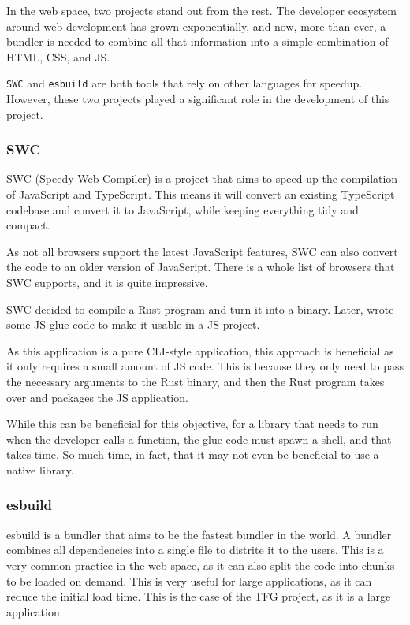 \documentclass[10pt,journal,compsoc]{IEEEtran}
\begin{document}
In the web space, two projects stand out from the rest. The developer ecosystem around web development has grown exponentially, and now, more than ever, a bundler \cite{Bundler} is needed to combine all that information into a simple combination of HTML, CSS, and JS.

\verb|SWC| and \verb|esbuild| are both tools that rely on other languages for speedup. However, these two projects played a significant role in the development of this project.

\subsubsection{SWC}

SWC (Speedy Web Compiler) is a project that aims to speed up the compilation of JavaScript and TypeScript. This means it will convert an existing TypeScript codebase and convert it to JavaScript, while keeping everything tidy and compact.

As not all browsers support the latest JavaScript features, SWC can also convert the code to an older version of JavaScript. There is a whole list of browsers that SWC supports, and it is quite impressive.

SWC decided to compile a Rust program and turn it into a binary. Later, wrote some JS glue code to make it usable in a JS project.

As this application is a pure CLI-style application, this approach is beneficial as it only requires a small amount of JS code. This is because they only need to pass the necessary arguments to the Rust binary, and then the Rust program takes over and packages the JS application.

While this can be beneficial for this objective, for a library that needs to run when the developer calls a function, the glue code must spawn a shell, and that takes time. So much time, in fact, that it may not even be beneficial to use a native library.

\subsubsection{esbuild}

esbuild is a bundler \cite{Bundler} that aims to be the fastest bundler in the world. A bundler combines all dependencies into a single file to distrite it to the users. This is a very common practice in the web space, as it can also split the code into chunks to be loaded on demand. This is very useful for large applications, as it can reduce the initial load time. This is the case of the TFG \cite{TFG} project, as it is a large application.
\end{document}
